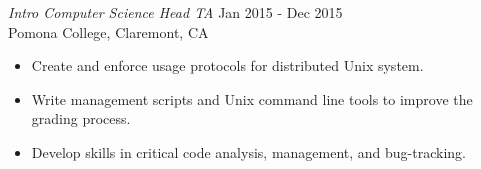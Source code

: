{\sl Intro Computer Science Head TA} \hfill Jan 2015 - Dec 2015 \\
Pomona College, Claremont, CA
\begin{itemize} \itemsep -2pt %
\item Create and enforce usage protocols for distributed Unix system.
\item Write management scripts and Unix command line tools to improve the grading process.
\item Develop skills in critical code analysis, management, and bug-tracking.
\end{itemize}
